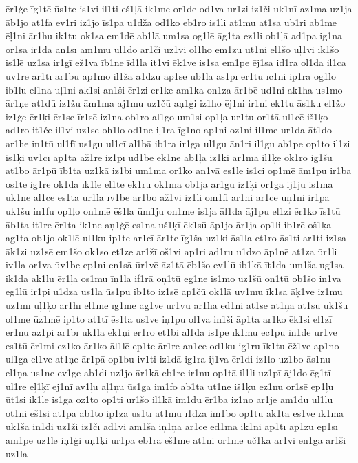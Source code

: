 {ēr1ģe
īg1tē
ūs1te
is1vi
il1ti
eš1ļā
ik1me
or1de
od1va
ur1zi
iz1či
uk1nī
az1ma
uz1ja
āb1jo
at1fa
ev1ri
iz1jo
īs1pa
u1dža
od1ko
eb1ro
is1li
at1mu
at1sa
ub1ri
ab1me
ēļ1ni
ār1hu
ik1tu
ok1sa
em1dē
ab1lā
um1sa
og1lē
āg1ta
ez1li
ob1ļā
ad1pa
ig1na
or1sā
ir1da
an1sī
am1mu
ul1do
ār1či
uz1vi
ol1ho
em1zu
ut1ni
el1šo
uļ1vi
īk1šo
is1lē
uz1sa
ir1gī
ež1va
īb1ne
īd1la
it1vi
ēk1ve
is1sa
em1pe
ēj1sa
id1ra
ol1da
il1ca
uv1re
ār1tī
ar1bū
ap1mo
il1ža
a1dzu
ap1se
ub1lā
as1pī
er1tu
īc1ni
ip1ra
og1lo
ib1lu
el1na
uļ1ni
ak1si
an1ši
ēr1zi
er1ke
am1ka
on1za
ār1bē
ud1ni
ak1ha
us1mo
ār1ņe
at1dū
iz1žu
ām1ma
aj1mu
uz1čū
aņ1ģi
iz1ho
ēj1ni
ir1ni
ek1tu
ās1ku
el1žo
iz1ģe
ēr1ķi
ēr1se
īr1sē
iz1na
ob1ro
al1go
um1si
op1ļa
ur1tu
or1tā
ul1cē
iš1ķo
ad1ro
it1če
il1vi
uz1se
oh1lo
od1ne
iļ1ra
īg1no
ap1ni
oz1ni
il1me
ur1da
āt1do
ar1he
in1tū
ul1fī
us1gu
ul1cī
al1bā
ib1ra
ir1ga
ul1gu
ān1ri
il1gu
ab1pe
op1to
il1zi
is1ķi
uv1cī
ap1tā
až1re
iz1pī
ud1be
ek1ne
ab1ļa
iz1ki
ar1mā
iļ1ķe
ok1ro
ig1šu
at1bo
ār1pū
īb1ta
uz1kā
iz1bi
um1ma
or1ko
an1vā
es1le
is1ci
op1mē
ām1pu
ir1ba
os1tē
ig1rē
ok1da
īk1le
el1te
ek1ru
ok1mā
ob1ja
ar1gu
iz1ķi
or1gā
ij1jū
is1mā
ūk1nē
al1ce
ēs1tā
ur1la
īv1bē
ar1bo
až1vi
iz1li
om1fi
ar1ni
ār1cē
uņ1ni
ir1pā
uk1šu
in1fu
op1ļo
on1mē
ēš1la
ūm1ju
on1me
is1ja
āl1da
āj1pu
el1zi
ēr1ko
īs1tū
āb1ta
it1re
ēr1ta
ik1ne
aņ1ģē
es1na
uš1ķī
ēk1sū
āp1jo
ār1ja
op1li
ib1rē
oš1ķa
ag1ta
ob1jo
ok1lē
ul1ku
ip1te
ar1cī
ār1te
īg1ša
uz1ki
ās1la
et1ro
ās1ti
ar1ti
iz1sa
āk1zi
uz1sē
em1šo
ok1so
et1ze
ar1žī
oš1vi
ap1ri
ad1ru
u1dzo
āp1nē
at1za
ūr1li
iv1la
or1va
ūv1be
ep1ni
eņ1sā
ūr1vē
āz1tā
ēb1šo
ev1lū
ib1kā
īt1da
um1ša
ug1sa
ik1da
ak1lu
ēr1ļa
os1mu
īņ1la
if1rā
oņ1tū
eg1ne
is1mo
uz1šū
on1tū
ob1šo
in1va
eg1lū
ir1pi
u1dza
us1la
ūs1pu
ib1to
iz1sē
ap1čū
ok1lā
uv1mu
īk1sa
āķ1ve
iz1mu
uz1mī
uļ1ķo
ar1hī
ēl1me
īg1me
ag1ve
ur1vu
ār1ha
ed1ni
āt1se
at1ņa
at1sū
ūk1šu
ol1me
ūz1mē
ip1to
at1tī
ēs1ta
us1ve
iņ1pu
ol1va
in1ši
āp1ta
ar1ko
ēk1si
el1zī
er1nu
az1pi
ār1bī
uk1la
ek1ņi
er1ro
ēt1bi
al1da
is1pe
īk1mu
ēc1pu
in1dē
ūr1ve
es1tū
ēr1mi
ez1ko
ār1ko
āl1lē
ep1te
ār1re
an1ce
od1ku
ig1ru
īk1tu
ēž1ve
ap1no
ul1ga
el1ve
at1ņe
ār1pā
op1bu
iv1ti
iz1dā
ig1ra
ij1va
ēr1di
iz1lo
uz1bo
ās1nu
el1ņa
us1ne
ev1ge
ab1di
uz1jo
ār1kā
eb1re
ir1nu
op1tā
il1li
uz1pī
āj1do
ēg1tī
ul1re
eļ1ķī
ej1nī
av1ļu
aļ1ņu
ūs1ga
im1fo
ab1ta
ut1ne
iš1ķu
ez1nu
or1sē
ep1ļu
ūt1si
ik1le
is1ga
oz1to
op1ti
ur1šo
il1kā
im1du
ēr1ba
iz1no
ar1je
am1du
ul1lu
ot1ni
eš1si
at1pa
ab1to
ip1zā
ūs1tī
at1mū
ī1dza
im1bo
op1tu
ak1ta
es1ve
īk1ma
ūk1ša
in1di
uz1ži
iz1čī
ad1vi
am1šā
iņ1ņa
ār1ce
ēd1ma
ik1ni
ap1tī
ap1zu
ep1sī
am1pe
uz1lē
iņ1ģi
uņ1ķi
ur1pa
eb1ra
eš1me
āt1ni
or1me
uč1ka
ar1vi
en1gā
ar1ši
uz1la
}
